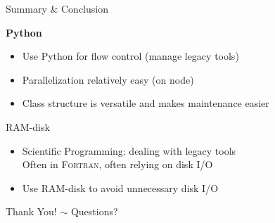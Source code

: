 \documentclass[hyperref={pdfpagelabels=false},compress,final]{beamer}
\begin{document}
\begin{frame}{Summary \& Conclusion}

  {\Large \color{teal} \textbf{Python} }\smallskip
  \begin{itemize}
    \item Use Python for flow control (manage legacy tools) \medskip
    \item Parallelization relatively easy (on node) \medskip
    \item Class structure is versatile and makes maintenance easier \medskip
  \end{itemize}
  \bigskip
  {\Large \color{purple} {RAM}-disk }\smallskip
  \begin{itemize}
    \item Scientific Programming: dealing with legacy tools\\
          Often in \textsc{Fortran}, often relying on disk I/O \medskip
    \item Use RAM-disk to avoid unnecessary disk I/O \medskip
  \end{itemize}
\end{frame}

\begin{frame}
 \vfill
 \begin{center}
 \LARGE
 Thank You!\hspace{1.5cm}  $\sim$ \hspace{1.5cm} Questions?
 \end{center}
 \vfill
\end{frame}

\end{document}
